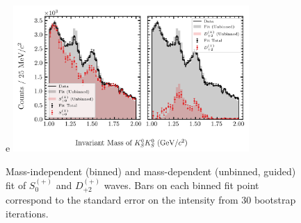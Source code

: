 \begin{figure}
  \begin{center}                                                                                                                                                                                                                                                                                                                                                                                                                                                                                                                                                                                                                                                                                                                                                                                                                                                                                     e
    \includegraphics[width=0.8\textwidth]{figures/binned_and_unbinned_fit_chisqdof_3.4_splot_D_1s_2b_guided_phase_factor_waves491_uncertainty_bootstrap-SE.png}
  \end{center}
  \caption{Mass-independent (binned) and mass-dependent (unbinned, guided) fit of $S_{0}^{(+)}$ and $D_{+2}^{(+)}$ waves. Bars on each binned fit point correspond to the standard error on the intensity from $ 30 $ bootstrap iterations.}\label{fig:unbinned-guided-fit-chisqdof-3.4-Sp-D2p}
\end{figure}

